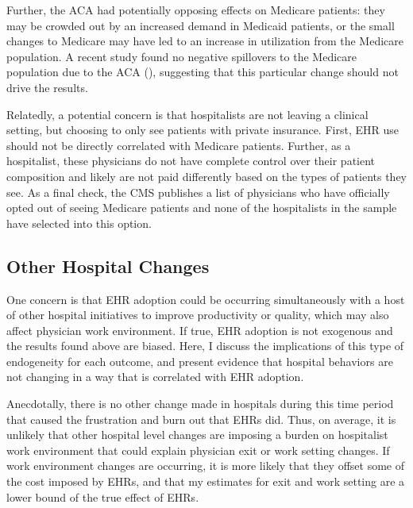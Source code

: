 \documentclass[12pt]{article}
\begin{document}
Further, the ACA had potentially opposing effects on Medicare patients: they may be crowded out by an increased demand in Medicaid patients, or the small changes to Medicare may have led to an increase in utilization from the Medicare population. A recent study found no negative spillovers to the Medicare population due to the ACA (\cite{carey2020impact}), suggesting that this particular change should not drive the results. 

Relatedly, a potential concern is that hospitalists are not leaving a clinical setting, but choosing to only see patients with private insurance. First, EHR use should not be directly correlated with Medicare patients. Further, as a hospitalist, these physicians do not have complete control over their patient composition and likely are not paid differently based on the types of patients they see. As a final check, the CMS publishes a list of physicians who have officially opted out of seeing Medicare patients and none of the hospitalists in the sample have selected into this option. 

\subsection{Other Hospital Changes}\label{sec:hospanalysis}

One concern is that EHR adoption could be occurring simultaneously with a host of other hospital initiatives to improve productivity or quality, which may also affect physician work environment. If true, EHR adoption is not exogenous and the results found above are biased. Here, I discuss the implications of this type of endogeneity for each outcome, and present evidence that hospital behaviors are not changing in a way that is correlated with EHR adoption.

Anecdotally, there is no other change made in hospitals during this time period that caused the frustration and burn out that EHRs did. Thus, on average, it is unlikely that other hospital level changes are imposing a burden on hospitalist work environment that could explain physician exit or work setting changes. If work environment changes are occurring, it is more likely that they offset some of the cost imposed by EHRs, and that my estimates for exit and work setting are a lower bound of the true effect of EHRs. 
\end{document}

